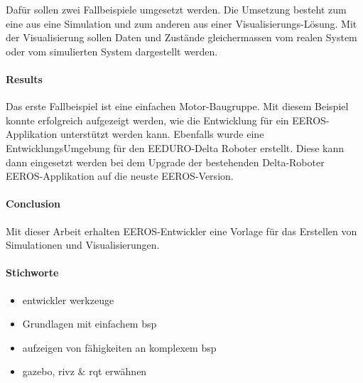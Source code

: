 Dafür sollen zwei Fallbeispiele umgesetzt werden.
Die Umsetzung besteht zum eine aus eine Simulation und zum anderen aus einer Visualisierungs-Lösung.
Mit der Visualisierung sollen Daten und Zustände gleichermassen vom realen System oder vom simulierten System dargestellt werden.

\paragraph*{Results}

Das erste Fallbeispiel ist eine einfachen Motor-Baugruppe.
Mit diesem Beispiel konnte erfolgreich aufgezeigt werden, wie die Entwicklung für ein EEROS-Applikation unterstützt werden kann.
Ebenfalls wurde eine Entwicklungs\-Umgebung für den EEDURO-Delta Roboter erstellt.
Diese kann dann eingesetzt werden bei dem Upgrade der bestehenden Delta-Roboter EEROS-Applikation auf die neuste EEROS-Version.

\paragraph*{Conclusion}

Mit dieser Arbeit erhalten EEROS-Entwickler eine Vorlage für das Erstellen von Simulationen und Visualisierungen.

\paragraph*{Stichworte}
\begin{itemize}
\item entwickler werkzeuge
\item Grundlagen mit einfachem bsp
\item aufzeigen von fähigkeiten an komplexem bsp
\item gazebo, rivz \& rqt erwähnen
\end{itemize}